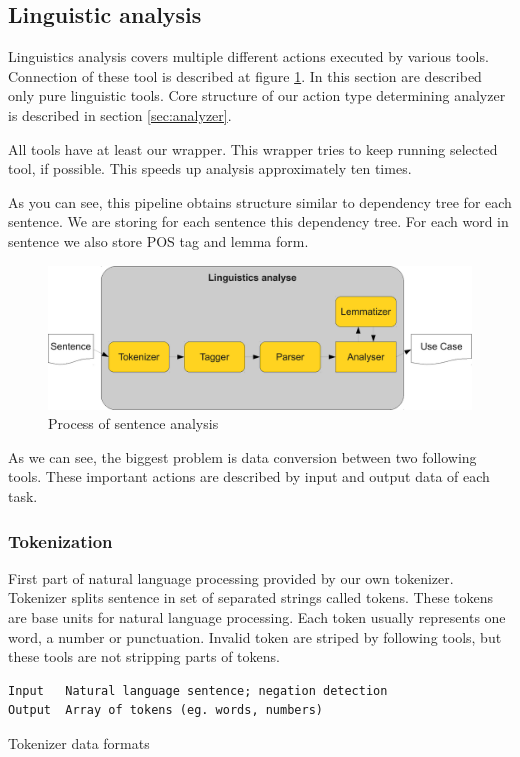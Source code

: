 \subsection{Linguistic analysis}
\label{sec:analysis}
Linguistics analysis covers multiple different actions executed by various tools. Connection of these tool is described at figure \ref{fig:LinguisticsAnalyse}. In this section are described only pure linguistic tools. Core structure of our action type determining analyzer is described in section \ref{sec:analyzer}.

All tools have at least our wrapper. This wrapper tries to keep running selected tool, if possible. This speeds up analysis approximately ten times.

As you can see, this pipeline obtains structure similar to dependency tree for each sentence. We are storing for each sentence this dependency tree. For each word in sentence we also store POS tag and lemma form.

\begin{figure}[ht]
  \centering
  \includegraphics[width=400pt]{images/LinguisticsAnalyse}
  \caption{Process of sentence analysis}
  \label{fig:LinguisticsAnalyse}
\end{figure}

As we can see, the biggest problem is data conversion between two following tools. These important actions are described by input and output data of each task.

\subsubsection{Tokenization}
First part of natural language processing provided by our own tokenizer. Tokenizer splits sentence in set of separated strings called tokens. These tokens are base units for natural language processing. Each token usually represents one word, a number or punctuation. Invalid token are striped by following tools, but these tools are not stripping parts of tokens.

\begin{table}[ht]   %
\begin{center}
    \begin{verbatim}
Input 	Natural language sentence; negation detection
Output 	Array of tokens (eg. words, numbers) 
        \end{verbatim}
  \caption{Tokenizer data formats}
  \label{tab.tokenization}
\end{center}
\end{table} 

